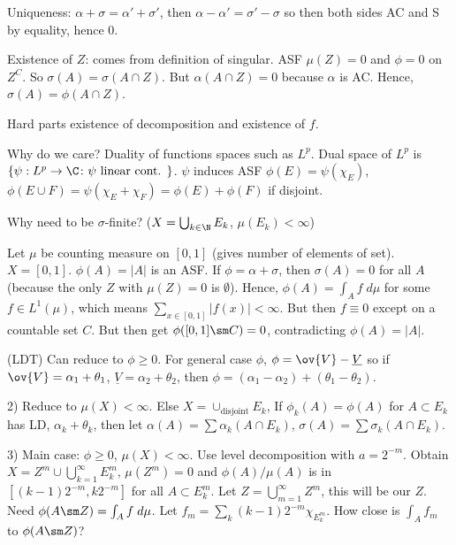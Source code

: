 \pf Uniqueness: $\alpha+\sigma= \alpha' + \sigma'$, then $\alpha-\alpha'= \sigma'-\sigma$ so then both sides AC and S by equality, hence 0. 



Existence of $Z$: comes from definition of singular. ASF $\mu(Z)=0$ and $\phi=0$ on $Z^C$. So $\sigma(A)= \sigma(A \cap Z)$. But $\alpha(A \cap Z)=0$ because $\alpha$ is AC. Hence, $\sigma(A)= \phi(A \cap Z)$. 

Hard parts existence of decomposition and existence of $f$. 





Why do we care? Duality of functions spaces such as $L^p$. Dual space of $L^p$ is $\{ \psi : L^p \to \C \colon \psi \text{ linear cont. }\}$. $\psi$ induces ASF $\phi(E)= \psi(\chi_E)$, $\phi(E \cup F)= \psi(\chi_E + \chi_F)= \phi(E) + \phi(F)$ if disjoint. 


Why need to be $\sigma$-finite?  ($X= \bigcup_{k \in \N} E_k$, $\mu(E_k)<\infty$)

\begin{ex}
Let $\mu$ be counting measure on $[0,1]$ (gives number of elements of set). $X=[0,1]$. $\phi(A)= |A|$ is an ASF. If $\phi= \alpha + \sigma$, then $\sigma(A)=0$ for all $A$ (because the only $Z$ with $\mu(Z)=0$ is $\emptyset$). Hence, $\phi(A)=  \int_A f \; d\mu$ for some $f \in L^1(\mu)$, which means $\sum_{x \in [0,1]} |f(x)|<\infty$. But then $f \equiv 0$ except on a countable set $C$. But then get $\phi([0,1] \sm C)= 0$, contradicting $\phi(A)=|A|$.
\end{ex}


\pf (LDT) Can reduce to $\phi \geq 0$. For general case $\phi$, $\phi = \ov{V} - \underline{V}$ so if $\ov{V} = \alpha_1 + \theta_1$, $\underline{V}= \alpha_2 + \theta_2$, then $\phi= (\alpha_1-\alpha_2) + (\theta_1-\theta_2)$.

2) Reduce to $\mu(X)<\infty$. Else $X= \cup_{\text{disjoint}} E_k$, If $\phi_k(A)= \phi(A)$ for $A \subset E_k$ has LD, $\alpha_k+\theta_k$, then let $\alpha(A)= \sum \alpha_k(A \cap E_k)$, $\sigma(A)= \sum \sigma_k(A \cap E_k)$. 

3) Main case: $\phi \geq 0$, $\mu(X)< \infty$. Use level decomposition with $a= 2^{-m}$. Obtain $X= Z^m \cup \bigcup_{k=1}^\infty E_k^m$, $\mu(Z^m)=0$ and $\phi(A)/\mu(A)$ is in $[(k-1)2^{-m}, k2^{-m}]$ for all $A \subset E_k^m$. Let $Z = \bigcup_{m=1}^\infty Z^m$, this will be our $Z$. Need $\phi(A \sm Z)= \int_A f \; d\mu$. Let $f_m = \sum_k (k-1) 2^{-m} \chi_{E_k^m}$. How close is $\int_A f_m$ to $\phi(A \sm Z)$?

